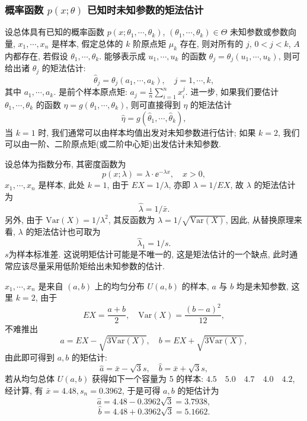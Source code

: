 \subsubsection{概率函数 $p(x;\theta)$ 已知时未知参数的矩法估计}

设总体具有已知的概率函数 $p(x;\theta_1,\cdots,\theta_k)$, $(\theta_1,\cdots,\theta_k)\in \Theta$ 未知参数或参数向量,  $x_1,\cdots,x_n$ 是样本, 假定总体的 $k$ 阶原点矩 $\mu_k$ 存在, 则对所有的 $j$,
$0<j<k$, $A$ 内都存在, 若假设 $\theta_1,\cdots,\theta_k$. 能够表示成 $u_1,\cdots,u_k$ 的函数 $\theta_j=\theta_j(u_1,\cdots,u_k)$, 则可给出诸 $\theta_j$ 的矩法估计:
\begin{equation}
\hat{\theta}_j=\theta_j(a_1,\cdots,a_k),\quad j=1,\cdots,k,
\end{equation}
其中 $a_1,\cdots,a_k$. 是前个样本原点矩: $a_j=\frac{1}{n}\sum_{i=1}^{n}x_i^j$. 进一步, 如果我们要估计 $\theta_1,\cdots,\theta_k$
的函数 $\eta=g(\theta_1,\cdots,\theta_k)$, 则可直接得到 $\eta$ 的矩法估计
\begin{equation}
\hat{\eta}=g(\hat{\theta}_1,\cdots,\hat{\theta}_k),
\end{equation}
当 $k=1$ 时, 我们通常可以由样本均值出发对未知参数进行估计; 如果 $k=2$, 我们可以由一阶、二阶原点矩(或二阶中心矩)出发估计未知参数.

\begin{example}
设总体为指数分布, 其密度函数为
\[p(x;\lambda)=\lambda\cdot\ee^{-\lambda x},\quad x>0, \]
$x_1,\cdots,x_n$ 是样本, 此处 $k=1$, 由于 $EX=1/\lambda$, 亦即 $\lambda=1/EX$, 故 $\lambda$ 的矩法估计为
\[\hat{\lambda}=1/\bar{x}. \]
另外, 由于 $\mathrm{Var}(X)=1/\lambda^2$, 其反函数为 $\lambda=1/\sqrt{\mathrm{Var}(X)}$, 因此, 从替换原理来看, $\lambda$ 的矩法估计也可取为
\[\hat{\lambda}_1=1/s. \]
$s$为样本标准差. 这说明矩估计可能是不唯一的, 这是矩法估计的一个缺点, 此时通常应该尽量采用低阶矩给出未知参数的估计.
\end{example}

\begin{example}
$x_1,\cdots,x_n$ 是来自 $(a,b)$ 上的均匀分布 $U(a,b)$ 的样本, $a$ 与 $b$ 均是未知参数, 这里 $k=2$, 由于
\[EX=\frac{a+b}{2},\quad\mathrm{Var}(X)=\frac{(b-a)^2}{12}, \]
不难推出
\[a=EX-\sqrt{3\mathrm{Var}(X)},\quad b=EX+\sqrt{3\mathrm{Var}(X)}, \]
由此即可得到 $a,b$ 的矩估计:
\[\hat{a}=\bar{x}-\sqrt{3}s,\quad\hat{b}=\bar{x}+\sqrt{3}s, \]
若从均匀总体 $U(a,b)$ 获得如下一个容量为 5 的样本: $4.5\quad5.0\quad4.7\quad4.0\quad4.2$, 经计算, 有 $\bar{x}=4.48,s_n=0.3962$, 于是可得 $a,b$ 的矩估计为
\[\hat{a}=4.48-0.3962\sqrt{3}=3.7938,\]
\[\hat{b}=4.48+0.3962\sqrt{3}=5.1662.\]
\end{example}

